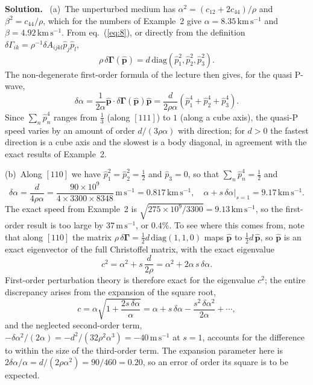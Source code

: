 \documentclass[a4paper,12pt]{paper}
\newenvironment{solution}{\par\noindent\textbf{Solution.}\ }{\par\medskip}
\begin{document}
\begin{solution}
(a)~The unperturbed medium has $\alpha^{2}=(c_{12}+2c_{44})/\rho$ and $\beta^{2}=c_{44}/\rho$,
which for the numbers of Example~2 give $\alpha=8.35\,\mathrm{km\,s^{-1}}$ and
$\beta=4.92\,\mathrm{km\,s^{-1}}$. From eq.~(\ref{eq:8}), or directly from the definition
$\delta\Gamma_{ik}=\rho^{-1}\delta A_{ijkl}\hat{p}_{j}\hat{p}_{l}$,
\begin{equation}
\rho\,\delta\bm{\Gamma}(\hat{\mathbf{p}})=d\,\mathrm{diag}(\hat{p}_{1}^{2},\hat{p}_{2}^{2},\hat{p}_{3}^{2}).
\label{eq:23}
\end{equation}
The non-degenerate first-order formula of the lecture then gives, for the quasi P-wave,
\begin{equation}
\delta\alpha=\frac{1}{2\alpha}\hat{\mathbf{p}}\cdot\delta\bm{\Gamma}(\hat{\mathbf{p}})\hat{\mathbf{p}}
=\frac{d}{2\rho\alpha}\left(\hat{p}_{1}^{4}+\hat{p}_{2}^{4}+\hat{p}_{3}^{4}\right).
\label{eq:24}
\end{equation}
Since $\sum_{n}\hat{p}_{n}^{4}$ ranges from $\tfrac{1}{3}$ (along $[111]$) to $1$ (along a cube
axis), the quasi-P speed varies by an amount of order $d/(3\rho\alpha)$ with direction; for
$d>0$ the fastest direction is a cube axis and the slowest is a body diagonal, in agreement with the exact
results of Example~2.

(b)~Along $[110]$ we have $\hat{p}_{1}^{2}=\hat{p}_{2}^{2}=\tfrac{1}{2}$ and $\hat{p}_{3}=0$,
so that $\sum_{n}\hat{p}_{n}^{4}=\tfrac{1}{2}$ and
\begin{equation}
\delta\alpha=\frac{d}{4\rho\alpha}=\frac{90\times10^{9}}{4\times3300\times8348}\,\mathrm{m\,s^{-1}}=0.817\,\mathrm{km\,s^{-1}},
\quad \alpha+s\,\delta\alpha\big|_{s=1}=9.17\,\mathrm{km\,s^{-1}}.
\label{eq:25}
\end{equation}
The exact speed from Example~2 is $\sqrt{275\times10^{9}/3300}=9.13\,\mathrm{km\,s^{-1}}$, so
the first-order result is too large by $37\,\mathrm{m\,s^{-1}}$, or $0.4\%$. To see where this
comes from, note that along $[110]$ the matrix $\rho\,\delta\bm{\Gamma}=\tfrac{1}{2}d\,\mathrm{diag}(1,1,0)$
maps $\hat{\mathbf{p}}$ to $\tfrac{1}{2}d\,\hat{\mathbf{p}}$, so $\hat{\mathbf{p}}$ is an exact
eigenvector of the full Christoffel matrix, with the exact eigenvalue
\begin{equation}
c^{2}=\alpha^{2}+s\,\frac{d}{2\rho}=\alpha^{2}+2\alpha\,s\,\delta\alpha.
\label{eq:26}
\end{equation}
First-order perturbation theory is therefore exact for the eigenvalue $c^{2}$; the entire
discrepancy arises from the expansion of the square root,
\begin{equation}
c=\alpha\sqrt{1+\frac{2s\,\delta\alpha}{\alpha}}
=\alpha+s\,\delta\alpha-\frac{s^{2}\,\delta\alpha^{2}}{2\alpha}+\cdots,
\label{eq:27}
\end{equation}
and the neglected second-order term, $-\delta\alpha^{2}/(2\alpha)=-d^{2}/(32\rho^{2}\alpha^{3})
=-40\,\mathrm{m\,s^{-1}}$ at $s=1$, accounts for the difference to within the size of the
third-order term. The expansion parameter here is
$2\delta\alpha/\alpha=d/(2\rho\alpha^{2})=90/460=0.20$, so an error of order its square is to be expected.


\end{solution}
\end{document}
